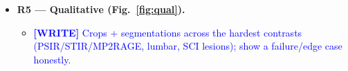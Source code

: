 \documentclass[11pt]{article}
\newcommand{\WRITE}[1]{\textcolor{blue}{\textbf{[WRITE]} #1}}
\newcommand{\FUTURE}[1]{\textcolor{orange}{\textbf{[FUTURE]} #1}}
\begin{document}
\begin{itemize}
\begin{itemize}
{            (\texttt{morphometric\_plots.zip}).}
      \item \FUTURE{This figure literally grows by one model per release — it
            is the natural ``future models'' result. Describe it as a living
            benchmark.}
    \end{itemize}
  \item \textbf{R5 — Qualitative (Fig.~\ref{fig:qual}).}
    \begin{itemize}
      \item \WRITE{Crops + segmentations across the hardest contrasts
            (PSIR/STIR/MP2RAGE, lumbar, SCI lesions); show a failure/edge case
            honestly.}
    \end{itemize}
\end{itemize}

\end{document}
